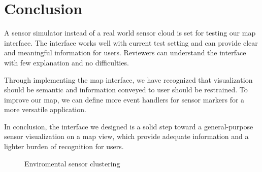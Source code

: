 \documentclass{article}
\begin{document}
\section{Conclusion}

A sensor simulator instead of a real world sensor cloud is set for testing our map interface. The interface works well with current test setting and can provide clear and meaningful information for users. Reviewers can understand the interface with few explanation and no difficulties.

Through implementing the map interface, we have recognized that visualization should be semantic and information conveyed to user should be restrained. To improve our map, we can define more event handlers for sensor markers for a more versatile application.

In conclusion, the interface we designed is a solid step toward a general-purpose sensor visualization on a map view, which provide adequate information and a lighter burden of recognition for users.

\newpage

\begin{figure}[htb]
\centering
{}
\caption{Enviromental sensor clustering}\label{fig:e}
\end{figure}
\end{document}
